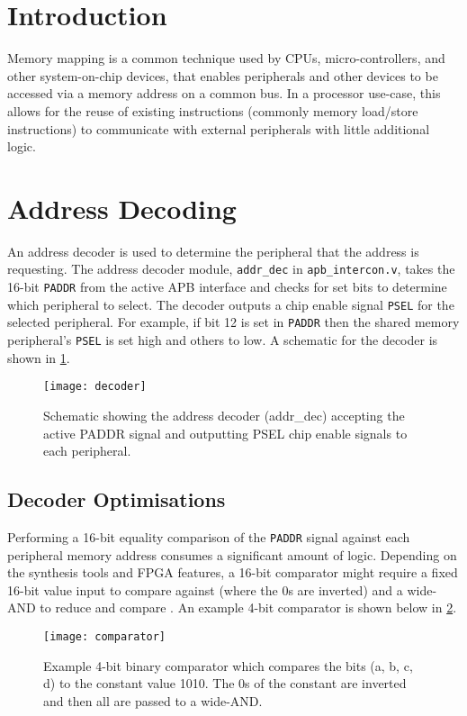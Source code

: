 \section{Introduction}
Memory mapping is a common technique used by CPUs, micro-controllers, and other system-on-chip devices, that enables peripherals and other devices to be accessed via a memory address on a common bus. In a processor use-case, this allows for the reuse of existing instructions (commonly memory load/store instructions) to communicate with external peripherals with little additional logic.

\section{Address Decoding}
An address decoder is used to determine the peripheral that the address is requesting. The address decoder module, \verb|addr_dec| in \verb|apb_intercon.v|, takes the 16-bit \verb|PADDR| from the active APB interface and checks for set bits to determine which peripheral to select. The decoder outputs a chip enable signal \verb|PSEL| for the selected peripheral. For example, if bit 12 is set in \verb|PADDR| then the shared memory peripheral's \verb|PSEL| is set high and others to low. A schematic for the decoder is shown in \cref{fig:decoder}.

\begin{figure}[H]
\centering
\texttt{[image: decoder]}
\caption{Schematic showing the address decoder (addr\_dec) accepting the active PADDR signal and outputting PSEL chip enable signals to each peripheral.}
\label{fig:decoder}
\end{figure}

\subsection{Decoder Optimisations}
Performing a 16-bit equality comparison of the \verb|PADDR| signal against each peripheral memory address consumes a significant amount of logic. Depending on the synthesis tools and FPGA features, a 16-bit comparator might require a fixed 16-bit value input to compare against (where the 0s are inverted) and a wide-AND to reduce and compare \cite{palchaudhuri2015high,salauyou2015designing}. An example 4-bit comparator is shown below in \cref{fig:comparator}.

\begin{figure}[H]
\centering
\texttt{[image: comparator]}
\caption{Example 4-bit binary comparator which compares the bits (a, b, c, d) to the constant value 1010. The 0s of the constant are inverted and then all are passed to a wide-AND.}
\label{fig:comparator}
\end{figure}

